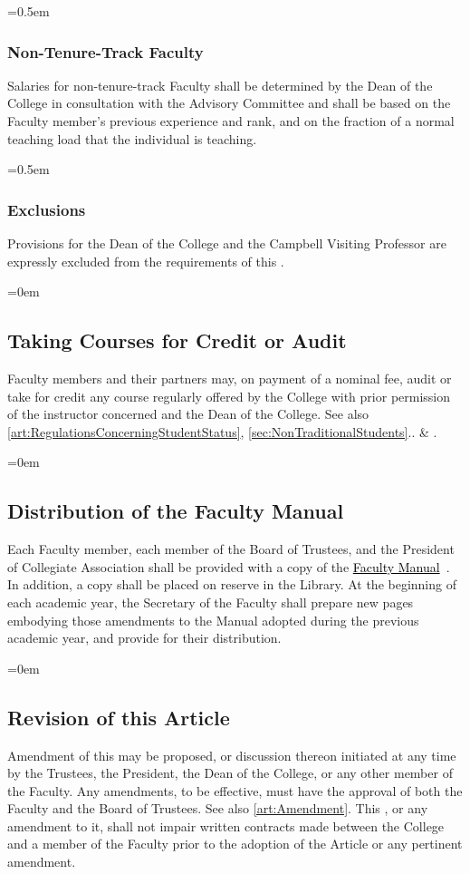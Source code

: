 \documentclass{manual}
\newcommand{\keyword}[1]{\textcolor{black}{#1}}
\newcommand{\facman}{\keyword{\underline{Faculty Manual}}~}
\let\oldsubsection\subsection
\renewcommand\subsection{\leftskip=0em\oldsubsection}
\let\oldsubsubsection\subsubsection
\renewcommand\subsubsection{\leftskip=0.5em\oldsubsubsection}
\begin{document}
\subsubsection{Non-Tenure-Track Faculty}
Salaries for non-tenure-track Faculty shall be determined by the Dean of the College in consultation with the Advisory Committee and shall be based on the Faculty member's previous experience and rank, and on the fraction of a normal teaching load that the individual is teaching.

\subsubsection{Exclusions}
Provisions for the Dean of the College and the Campbell Visiting Professor are expressly excluded from the requirements of this .

\subsection{Taking Courses for Credit or Audit}
Faculty members and their partners may, on payment of a nominal fee, audit or take for credit any course regularly offered by the College with prior permission of the instructor concerned and the Dean of the College. See also \cref{art:RegulationsConcerningStudentStatus}, \cref{sec:NonTraditionalStudents}.. \& .

\subsection{Distribution of the Faculty Manual}
Each Faculty member, each member of the Board of Trustees, and the President of Collegiate Association shall be provided with a copy of the \facman. In addition, a copy shall be placed on reserve in the Library. At the beginning of each academic year, the Secretary of the Faculty shall prepare new pages embodying those amendments to the Manual adopted during the previous academic year, and provide for their distribution.

\subsection{Revision of this Article}\label{sec:Revision}
Amendment of this  may be proposed, or discussion thereon initiated at any time by the Trustees, the President, the Dean of the College, or any other member of the Faculty. Any amendments, to be effective, must have the approval of both the Faculty and the Board of Trustees. See also \cref{art:Amendment}. This , or any amendment to it, shall not impair written contracts made between the College and a member of the Faculty prior to the adoption of the Article or any pertinent amendment.
\end{document}
